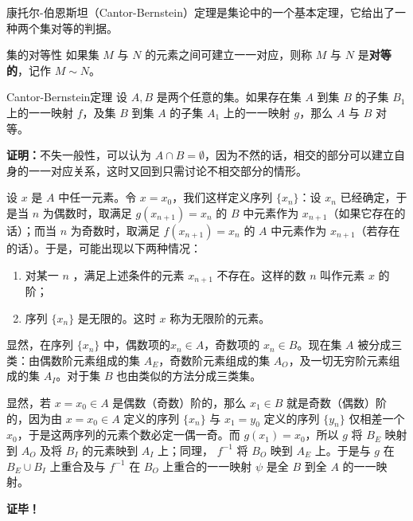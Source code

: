 康托尔-伯恩斯坦（Cantor-Bernstein）定理是集论中的一个基本定理，它给出了一种两个集对等的判据。
\begin{definition}{集的对等性}
如果集 $M$ 与 $N$ 的元素之间可建立一一对应，则称 $M$ 与 $N$ 是\textbf{对等的}，记作 $M\sim N$。
\end{definition}
\begin{theorem}{Cantor-Bernstein定理}
设 $A,B$ 是两个任意的集。如果存在集 $A$ 到集 $B$ 的子集 $B_1$ 上的一一映射 $f$，及集 $B$ 到集 $A$ 的子集 $A_1$ 上的一一映射 $g$，那么 $A$ 与 $B$ 对等。
\end{theorem}
\textbf{证明：}不失一般性，可以认为 $A\cap B=\emptyset$，因为不然的话，相交的部分可以建立自身的一一对应关系，这时又回到只需讨论不相交部分的情形。

设 $x$ 是 $A$ 中任一元素。令 $x=x_0$，我们这样定义序列 $\{x_n\}$：设 $x_n$ 已经确定，于是当 $n$ 为偶数时，取满足 $g(x_{n+1})=x_n$ 的 $B$ 中元素作为 $x_{n+1}$（如果它存在的话）；而当 $n$ 为奇数时，取满足 $f(x_{n+1})=x_n$ 的 $A$ 中元素作为 $x_{n+1}$（若存在的话）。于是，可能出现以下两种情况：
\begin{enumerate}
\item 对某一 $n$ ，满足上述条件的元素 $x_{n+1}$ 不存在。这样的数 $n$ 叫作元素 $x$ 的阶；
\item 序列 $\{x_n\}$ 是无限的。这时 $x$ 称为无限阶的元素。
\end{enumerate}
显然，在序列 $\{x_n\}$ 中，偶数项的$x_n\in A$，奇数项的 $x_n\in B$。现在集 $A$ 被分成三类：由偶数阶元素组成的集 $A_E$，奇数阶元素组成的集 $A_O$，及一切无穷阶元素组成的集 $A_I$。对于集 $B$ 也由类似的方法分成三类集。

显然，若 $x=x_0\in A$ 是偶数（奇数）阶的，那么 $x_1\in B$ 就是奇数（偶数）阶的，因为由 $x=x_0\in A$ 定义的序列 $\{x_n\}$ 与 $x_1=y_0$ 定义的序列 $\{y_n\}$ 仅相差一个 $x_0$，于是这两序列的元素个数必定一偶一奇。而 $g(x_1)=x_0$，所以 $g$ 将 $B_E$ 映射到 $A_O$ 及将 $B_I$ 的元素映到 $A_I$ 上；同理， $f^{-1}$ 将 $B_O$ 映到 $A_E$ 上。于是与 $g$ 在 $B_E\cup B_I$ 上重合及与 $f^{-1}$ 在 $B_O$ 上重合的一一映射 $\psi$ 是全 $B$ 到全 $A$ 的一一映射。 

\textbf{证毕！}